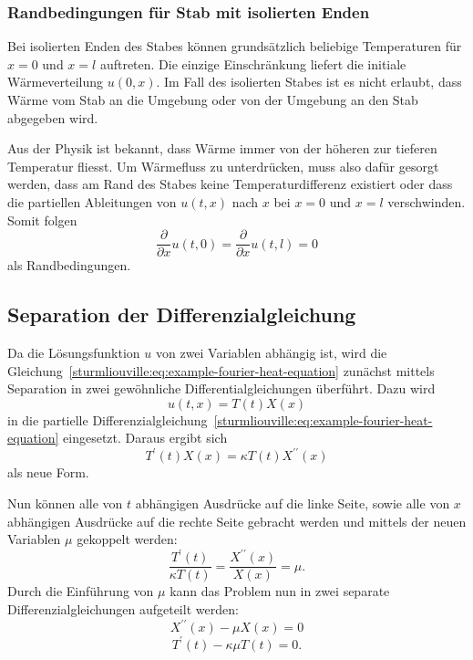 %
%

\subsubsection{Randbedingungen für Stab mit isolierten Enden}
%
Bei isolierten Enden des Stabes können grundsätzlich beliebige Temperaturen für
$x = 0$ und $x = l$ auftreten.
Die einzige Einschränkung liefert die initiale Wärmeverteilung $u(0, x)$.
Im Fall des isolierten Stabes ist es nicht erlaubt, dass Wärme vom Stab
an die Umgebung oder von der Umgebung an den Stab abgegeben wird.

Aus der Physik ist bekannt, dass Wärme immer von der höheren zur tieferen
Temperatur fliesst. Um Wärmefluss zu unterdrücken, muss also dafür gesorgt
werden, dass am Rand des Stabes keine Temperaturdifferenz existiert oder 
dass die partiellen Ableitungen von $u(t,x)$ nach $x$ bei $x = 0$ und $x = l$
verschwinden.
Somit folgen
\begin{equation}
    \label{sturmliouville:eq:example-fourier-boundary-condition-ends-isolated}
    \frac{\partial}{\partial x} u(t, 0)
    =
    \frac{\partial}{\partial x} u(t, l)
    =
    0
\end{equation}
als Randbedingungen.

%
%

\subsection{Separation der Differenzialgleichung
\label{sturmliouville:subsec:separation}}

Da die Lösungsfunktion $u$ von zwei Variablen abhängig ist, wird die
Gleichung~\eqref{sturmliouville:eq:example-fourier-heat-equation} zunächst
mittels Separation in zwei gewöhnliche Differentialgleichungen überführt.
Dazu wird 
\[
    u(t,x)
    =
    T(t)X(x)
\]
in die partielle
Differenzialgleichung~\eqref{sturmliouville:eq:example-fourier-heat-equation}
eingesetzt.
Daraus ergibt sich 
\[
    T^{\prime}(t)X(x)
    =
    \kappa T(t)X^{\prime \prime}(x)
\]
als neue Form.

Nun können alle von $t$ abhängigen Ausdrücke auf die linke Seite, sowie alle
von $x$ abhängigen Ausdrücke auf die rechte Seite gebracht werden und mittels
der neuen Variablen $\mu$ gekoppelt werden:
\[
    \frac{T^{\prime}(t)}{\kappa T(t)}
    =
    \frac{X^{\prime \prime}(x)}{X(x)}
    =
    \mu.
\]
Durch die Einführung von $\mu$ kann das Problem nun in zwei separate
Differenzialgleichungen aufgeteilt werden:
\begin{equation}
    \label{sturmliouville:eq:example-fourier-separated-x}
    X^{\prime \prime}(x) - \mu X(x)
    =
    0
\end{equation}
\begin{equation}
    \label{sturmliouville:eq:example-fourier-separated-t}
    T^{\prime}(t) - \kappa \mu T(t)
    =
    0.
\end{equation}

